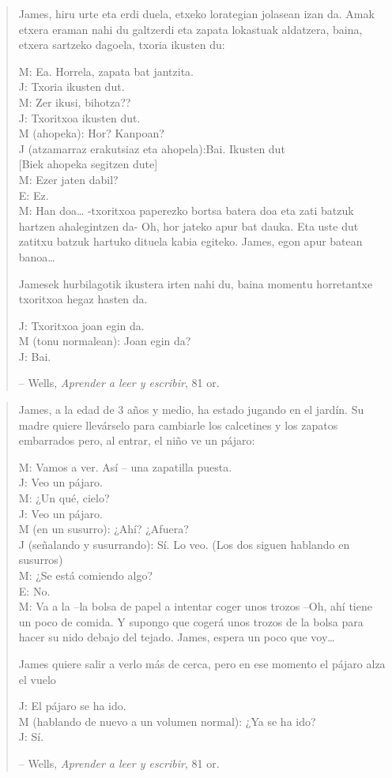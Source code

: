 \documentclass[
]{book}
\begin{document}
\begin{quote}
James, hiru urte eta erdi duela, etxeko lorategian jolasean izan da. Amak etxera eraman nahi du galtzerdi eta zapata lokastuak aldatzera, baina, etxera sartzeko dagoela, txoria ikusten du:

M: Ea. Horrela, zapata bat jantzita.\\
J: Txoria ikusten dut.\\
M: Zer ikusi, bihotza??\\
J: Txoritxoa ikusten dut.\\
M (ahopeka): Hor? Kanpoan?\\
J (atzamarraz erakutsiaz eta ahopela):Bai. Ikusten dut\\
{[}Biek ahopeka segitzen dute{]}\\
M: Ezer jaten dabil?\\
E: Ez.\\
M: Han doa\ldots{} -txoritxoa paperezko bortsa batera doa eta zati batzuk hartzen ahalegintzen da- Oh, hor jateko apur bat dauka. Eta uste dut zatitxu batzuk hartuko dituela kabia egiteko. James, egon apur batean banoa\ldots{}

Jamesek hurbilagotik ikustera irten nahi du, baina momentu horretantxe txoritxoa hegaz hasten da.

J: Txoritxoa joan egin da.\\
M (tonu normalean): Joan egin da?\\
J: Bai.

-- Wells, \emph{Aprender a leer y escribir}, 81 or.
\end{quote}

\begin{quote}
James, a la edad de 3 años y medio, ha estado jugando en el jardín. Su madre quiere llevárselo para cambiarle los calcetines y los zapatos embarrados pero, al entrar, el niño ve un pájaro:

M: Vamos a ver. Así -- una zapatilla puesta.\\
J: Veo un pájaro.\\
M: ¿Un qué, cielo?\\
J: Veo un pájaro.\\
M (en un susurro): ¿Ahí? ¿Afuera?\\
J (señalando y susurrando): Sí. Lo veo. (Los dos siguen hablando en susurros)\\
M: ¿Se está comiendo algo?\\
E: No.\\
M: Va a la --la bolsa de papel a intentar coger unos trozos --Oh, ahí tiene un poco de comida. Y supongo que cogerá unos trozos de la bolsa para hacer su nido debajo del tejado. James, espera un poco que voy\ldots{}

James quiere salir a verlo más de cerca, pero en ese momento el pájaro alza el vuelo

J: El pájaro se ha ido.\\
M (hablando de nuevo a un volumen normal): ¿Ya se ha ido?\\
J: Sí.

-- Wells, \emph{Aprender a leer y escribir}, 81 or.
\end{quote}
\end{document}
